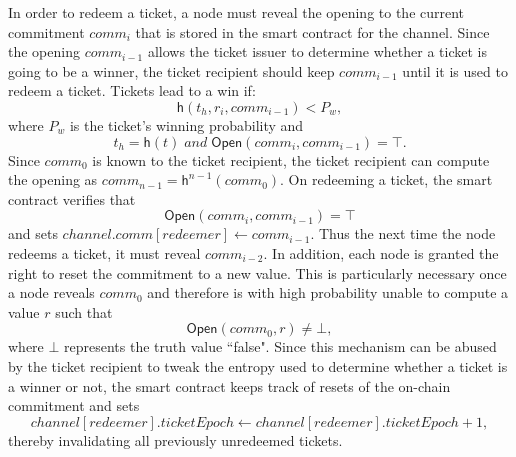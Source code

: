 In order to redeem a ticket, a node must reveal the opening to the current
commitment $comm_i$ that is stored in the smart contract for the channel. Since
the opening $comm_{i-1}$ allows the ticket issuer to determine whether a ticket
is going to be a winner, the ticket recipient should keep $comm_{i-1}$ until it is
used to redeem a ticket. Tickets lead to a win if: $$\mathsf{h}( t_h, r_i,
comm_{i-1} ) < P_w,$$ where $P_w$ is the ticket's winning probability and
$$t_h=\mathsf{h}(t) \;and\; \mathsf{Open}(comm_i, comm_{i-1}) = \top.$$ Since
$comm_{0}$ is known to the ticket recipient, the ticket recipient can compute
the opening as $comm_{n-1} = \mathsf{h}^{n-1}(comm_0)$. On redeeming a ticket,
the smart contract verifies that $$\mathsf{Open}(comm_i, comm_{i-1}) = \top$$
and sets $channel.comm[redeemer] \leftarrow comm_{i-1}$. Thus the next time the
node redeems a ticket, it must reveal $comm_{i-2}$. In addition, each node is
granted the right to reset the commitment to a new value. This is particularly necessary
once a node reveals $comm_0$ and therefore is with high probability
unable to compute a value $r$ such that $$\mathsf{Open}(comm_0,r) \neq \bot,$$
where $\bot$ represents the truth value ``false". 
Since this mechanism can
be abused by the ticket recipient to tweak the entropy used to determine
whether a ticket is a winner or not, the smart contract keeps track of resets of
the on-chain commitment and sets $$channel[redeemer].ticketEpoch \leftarrow
channel[redeemer].ticketEpoch +1 ,$$ thereby invalidating all previously
unredeemed tickets.
